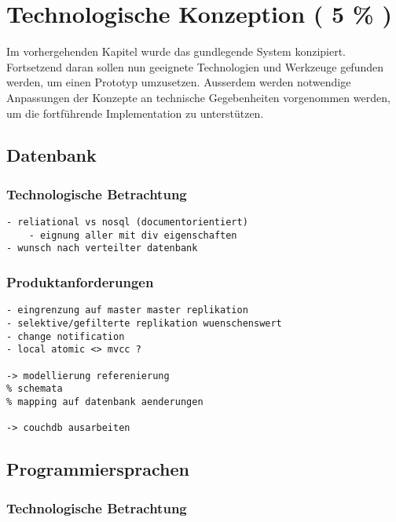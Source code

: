 \chapter{Technologische Konzeption ( 5 \% )}


Im vorhergehenden Kapitel wurde das gundlegende System konzipiert.
Fortsetzend daran sollen nun geeignete Technologien und Werkzeuge gefunden werden,
um einen Prototyp umzusetzen.
Ausserdem werden notwendige Anpassungen der Konzepte an technische Gegebenheiten vorgenommen werden,
um die fortf\"uhrende Implementation zu unterst\"utzen.





\section{Datenbank}
\subsection{Technologische Betrachtung}

\begin{verbatim}
- reliational vs nosql (documentorientiert)
    - eignung aller mit div eigenschaften
- wunsch nach verteilter datenbank
\end{verbatim}

\subsection{Produktanforderungen}

\begin{verbatim}
- eingrenzung auf master master replikation
- selektive/gefilterte replikation wuenschenswert
- change notification
- local atomic <> mvcc ?

-> modellierung referenierung
% schemata
% mapping auf datenbank aenderungen

-> couchdb ausarbeiten

\end{verbatim}


\section{Programmiersprachen}
\subsection{Technologische Betrachtung}

